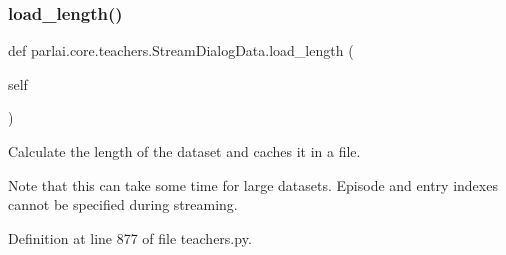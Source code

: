 \subsubsection{\texorpdfstring{load\+\_\+length()}{load\_length()}}
{\footnotesize\ttfamily def parlai.\+core.\+teachers.\+Stream\+Dialog\+Data.\+load\+\_\+length (\begin{DoxyParamCaption}\item[{}]{self }\end{DoxyParamCaption})}

\begin{DoxyVerb}Calculate the length of the dataset and caches it in a file.

Note that this can take some time for large datasets. Episode and entry indexes
cannot be specified during streaming.
\end{DoxyVerb}
 

Definition at line 877 of file teachers.\+py.


